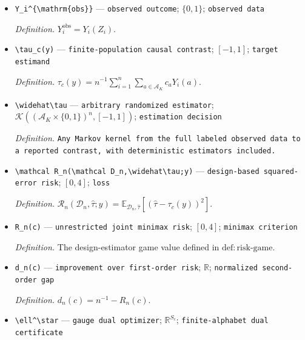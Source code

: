 \documentclass{article}
\begin{document}
\begin{itemize}
  \item \texttt{Y\_\allowbreak{}i\textasciicircum{}\{\textbackslash{}\allowbreak{}mathrm\{obs\}\allowbreak{}\}\allowbreak{}} --- \texttt{observed outcome}; \(\{0,1\}\); \texttt{observed data}
  \par\smallskip\noindent\emph{Definition.} \(Y_i^{\mathrm{obs}}=Y_i(Z_i)\).
  \item \texttt{\textbackslash{}\allowbreak{}tau\_\allowbreak{}c(y)} --- \texttt{finite-\allowbreak{}population causal contrast}; \([-1,1]\); \texttt{target estimand}
  \par\smallskip\noindent\emph{Definition.} \(\tau_c(y)=n^{-1}\sum_{i=1}^n\sum_{a\in\mathcal A_K}c_aY_i(a)\).
  \item \texttt{\textbackslash{}\allowbreak{}widehat\textbackslash{}\allowbreak{}tau} --- \texttt{arbitrary randomized estimator}; \(\mathcal K((\mathcal A_K\times\{0,1\})^n,[-1,1])\); \texttt{estimation decision}
  \par\smallskip\noindent\emph{Definition.} \texttt{Any Markov kernel from the full labeled observed data to a reported contrast,\allowbreak{} with deterministic estimators included.}
  \item \texttt{\textbackslash{}\allowbreak{}mathcal R\_\allowbreak{}n(\textbackslash{}\allowbreak{}mathcal D\_\allowbreak{}n,\allowbreak{}\textbackslash{}\allowbreak{}widehat\textbackslash{}\allowbreak{}tau;\allowbreak{}y)} --- \texttt{design-\allowbreak{}based squared-\allowbreak{}error risk}; \([0,4]\); \texttt{loss}
  \par\smallskip\noindent\emph{Definition.} \(\mathcal R_n(\mathcal D_n,\widehat\tau;y)=\mathbb E_{\mathcal D_n,\widehat\tau}[(\widehat\tau-\tau_c(y))^2]\).
  \item \texttt{R\_\allowbreak{}n(c)} --- \texttt{unrestricted joint minimax risk}; \([0,4]\); \texttt{minimax criterion}
  \par\smallskip\noindent\emph{Definition.} The design-estimator game value defined in \(\mathrm{def:risk\text{-}game}\).
  \item \texttt{d\_\allowbreak{}n(c)} --- \texttt{improvement over first-\allowbreak{}order risk}; \(\mathbb R\); \texttt{normalized second-\allowbreak{}order gap}
  \par\smallskip\noindent\emph{Definition.} \(d_n(c)=n^{-1}-R_n(c)\).
  \item \texttt{\textbackslash{}\allowbreak{}ell\textasciicircum{}\textbackslash{}\allowbreak{}star} --- \texttt{gauge dual optimizer}; \(\mathbb R^{S_c}\); \texttt{finite-\allowbreak{}alphabet dual certificate}

\end{itemize}
\end{document}
